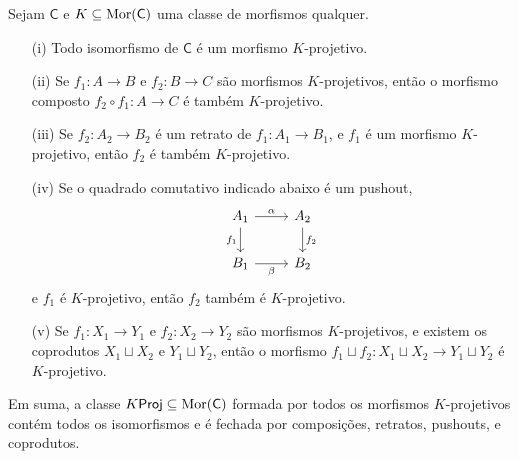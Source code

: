 \begin{prop}\label{prop:props_morfismos_proj}
  Sejam $\mathsf{C}$ e $K \subseteq \mathrm{Mor}(\mathsf{C})$ uma classe de morfismos qualquer.
  \begin{enumerate}
    \item[(i)] Todo isomorfismo de $\mathsf{C}$ é um morfismo $K$-projetivo.
    
    \item[(ii)] Se $f_1: A \to B$ e $f_2: B \to C$ são morfismos $K$-projetivos, então o morfismo composto $f_2 \circ f_1: A \to C$ é também $K$-projetivo.

    \item[(iii)] Se $f_2: A_2 \to B_2$ é um retrato de $f_1: A_1 \to B_1$, e $f_1$ é um morfismo $K$-projetivo, então $f_2$ é também $K$-projetivo.
    
    \item[(iv)] Se o quadrado comutativo indicado abaixo é um pushout,
    \begin{displaymath}
      \begin{tikzcd}
        A_1
        \arrow[r, "\alpha"]
        \arrow[d, "f_1" swap]
        & A_2
        \arrow[d, "f_2"]
        \\ B_1
        \arrow[r, "\beta" swap]
        & B_2
      \end{tikzcd}
    \end{displaymath}
    e $f_1$ é $K$-projetivo, então $f_2$ também é $K$-projetivo.

    \item[(v)] Se $f_1: X_1 \to Y_1$ e $f_2: X_2 \to Y_2$ são morfismos $K$-projetivos, e existem os coprodutos $X_1 \sqcup X_2$ e $Y_1 \sqcup Y_2$, então o morfismo $f_1 \sqcup f_2: X_1 \sqcup X_2 \to Y_1 \sqcup Y_2$ é $K$-projetivo.
  \end{enumerate}
  Em suma, a classe $K\mathsf{Proj} \subseteq \mathrm{Mor}(\mathsf{C})$ formada por todos os morfismos $K$-projetivos contém todos os isomorfismos e é fechada por composições, retratos, pushouts, e coprodutos.
\end{prop}

